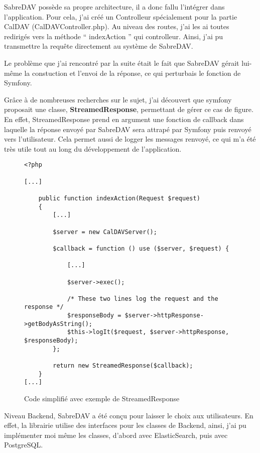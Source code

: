 SabreDAV possède sa propre architecture, il a donc fallu l'intégrer dans l'application. Pour cela, j'ai créé un Controlleur spécialement pour la partie CalDAV (CalDAVController.php). Au niveau des routes, j'ai les ai toutes redirigés vers la méthode `` indexAction '' qui controlleur. Ainsi, j'ai pu transmettre la requête directement au système de SabreDAV.

Le problème que j'ai rencontré par la suite était le fait que SabreDAV gérait lui-même la constuction et l'envoi de la réponse, ce qui perturbais le fonction de Symfony.

Grâce à de nombreuses recherches sur le sujet, j'ai découvert que symfony proposait une classe, \textbf{StreamedResponse}, permettant de gérer ce cas de figure. En effet, StreamedResponse prend en argument une fonction de callback dans laquelle la réponse envoyé par SabreDAV sera attrapé par Symfony puis renvoyé vers l'utilisateur. Cela permet aussi de logger les messages renvoyé, ce qui m'a été très utile tout au long du développement de l'application.

\begin{figure}[h]
\begin{lstlisting}[frame=single]
<?php

[...]

    public function indexAction(Request $request)
    {
        [...]

        $server = new CalDAVServer();

        $callback = function () use ($server, $request) {

            [...]

            $server->exec();

            /* These two lines log the request and the response */
            $responseBody = $server->httpResponse->getBodyAsString();
            $this->logIt($request, $server->httpResponse, $responseBody);
        };

        return new StreamedResponse($callback);
    }
[...]

\end{lstlisting}
\caption{Code simplifié avec exemple de StreamedResponse}
\end{figure}

Niveau Backend, SabreDAV a été conçu pour laisser le choix aux utilisateurs. En effet, la librairie utilise des interfaces pour les classes de Backend, ainsi, j'ai pu implémenter moi même les classes, d'abord avec ElasticSearch, puis avec PostgreSQL.

